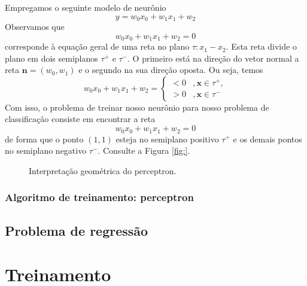 Empregamos o seguinte modelo de neurônio
\begin{equation}
  y = w_0x_0 + w_1x_1 + w_2
\end{equation}
Observamos que
\begin{equation}
  w_0x_0 + w_1x_1 + w_2 = 0
\end{equation}
corresponde à equação geral de uma reta no plano $\tau: x_1-x_2$. Esta reta divide o plano em dois semiplanos $\tau^+$ e $\tau^-$. O primeiro está na direção do vetor normal a reta $\pmb{n} = (w_0, w_1)$ e o segundo na sua direção oposta. Ou seja, temos
\begin{equation}
  w_0x_0 + w_1x_1 + w_2 = \left\{
    \begin{array}{ll}
      <0 &, \pmb{x}\in\tau^+,\\
      >0 &, \pmb{x}\in\tau^-
    \end{array}
  \right.
\end{equation}
Com isso, o problema de treinar nosso neurônio para nosso problema de classificação consiste em encontrar a reta
\begin{equation}
  w_0x_0 + w_1x_1 + w_2 = 0
\end{equation}
de forma que o ponto $(1,1)$ esteja no semiplano positivo $\tau^+$ e os demais pontos no semiplano negativo $\tau^-$. Consulte a Figura \ref{fig:}.

\begin{figure}[H]
  \centering
  
  \caption{Interpretação geométrica do perceptron.}
\end{figure}

\subsubsection{Algoritmo de treinamento: perceptron}

\emconstrucao

\subsection{Problema de regressão}

\emconstrucao

\section{Treinamento}

\emconstrucao
